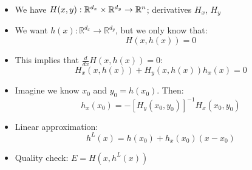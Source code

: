 \documentclass[bigger,handout]{beamer}
\newenvironment{stepitemize}{\begin{itemize}[<+->]}{\end{itemize} }
\begin{document}
\begin{frame}%
 

\begin{stepitemize}
\item We have $H(x,y):\mathbb{R}^{d_{x}}\times \mathbb{R}^{d_{y}}\rightarrow \mathbb{%
R}^{n}$; derivatives $H_{x}$, $H_{y}$

\item We want $h(x):\mathbb{R}^{d_{x}}\rightarrow \mathbb{R}^{d_{y}}$, but we only
know that: 
\begin{equation*}
H(x,h(x))=0
\end{equation*}

\item This implies that $\frac{d }{d x}H(x,h(x))=0$:%
\begin{equation*}
H_{x}\left( x,h(x)\right) +H_{y}\left( x,h(x)\right) h_{x}(x)=0
\end{equation*}

\item Imagine we know $x_{0}$ and $y_{0}=h\left( x_{0}\right) $. Then:%
\begin{equation*}
h_{x}(x_{0})=-\left[ H_{y}\left( x_{0},y_{0}\right) \right] ^{-1}H_{x}\left(
x_{0},y_{0}\right)
\end{equation*}

\item Linear approximation:%
\begin{equation*}
h^{L}(x)=h\left( x_{0}\right) +h_{x}\left( x_{0}\right) \left( x-x_{0}\right)
\end{equation*}

\item Quality check: $E=H(x,h^{L}(x))$
\end{stepitemize}

 
 
\end{frame}%
 
 
 
\end{document}
